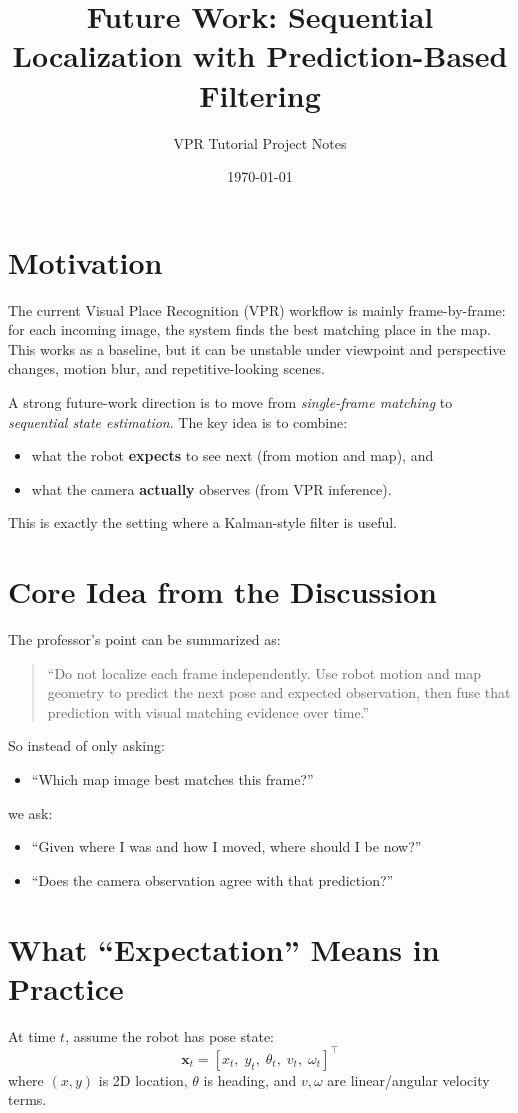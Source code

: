 \documentclass[11pt]{article}
\title{Future Work: Sequential Localization with Prediction-Based Filtering}
\author{VPR Tutorial Project Notes}
\date{\today}
\begin{document}
\maketitle

\section*{Motivation}
The current Visual Place Recognition (VPR) workflow is mainly frame-by-frame: for each incoming image, the system finds the best matching place in the map. This works as a baseline, but it can be unstable under viewpoint and perspective changes, motion blur, and repetitive-looking scenes.

A strong future-work direction is to move from \emph{single-frame matching} to \emph{sequential state estimation}. The key idea is to combine:
\begin{itemize}[leftmargin=*]
  \item what the robot \textbf{expects} to see next (from motion and map), and
  \item what the camera \textbf{actually} observes (from VPR inference).
\end{itemize}

This is exactly the setting where a Kalman-style filter is useful.

\section*{Core Idea from the Discussion}
The professor's point can be summarized as:
\begin{quote}
``Do not localize each frame independently. Use robot motion and map geometry to predict the next pose and expected observation, then fuse that prediction with visual matching evidence over time.''
\end{quote}

So instead of only asking:
\begin{itemize}[leftmargin=*]
  \item ``Which map image best matches this frame?''
\end{itemize}
we ask:
\begin{itemize}[leftmargin=*]
  \item ``Given where I was and how I moved, where should I be now?''
  \item ``Does the camera observation agree with that prediction?''
\end{itemize}

\section*{What ``Expectation'' Means in Practice}
At time $t$, assume the robot has pose state:
\[
\mathbf{x}_t = [x_t,\; y_t,\; \theta_t,\; v_t,\; \omega_t]^\top
\]
where $(x,y)$ is 2D location, $\theta$ is heading, and $v,\omega$ are linear/angular velocity terms.
\end{document}
